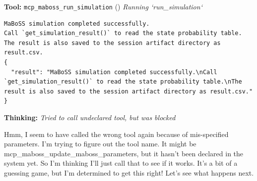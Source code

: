 \documentclass[11pt,a4paper]{article}
\begin{document}
\begin{toolokbox}
\textbf{Tool:} \texttt{mcp\_maboss\_run\_simulation} (\checkmark)
\textit{Running `run\_simulation`}
\begin{lstlisting}
MaBoSS simulation completed successfully.
Call `get_simulation_result()` to read the state probability table.
The result is also saved to the session artifact directory as result.csv.
{
  "result": "MaBoSS simulation completed successfully.\nCall `get_simulation_result()` to read the state probability table.\nThe result is also saved to the session artifact directory as result.csv."
}
\end{lstlisting}
\end{toolokbox}
\begin{thinkbox}
\textbf{Thinking:} \textit{Tried to call undeclared tool, but was blocked}

Hmm, I seem to have called the wrong tool again because of mis-specified parameters. I'm trying to figure out the tool name. It might be mcp\_maboss\_update\_maboss\_parameters, but it hasn't been declared in the system yet. So I'm thinking I'll just call that to see if it works. It’s a bit of a guessing game, but I’m determined to get this right! Let's see what happens next.

\end{thinkbox}
\end{document}
